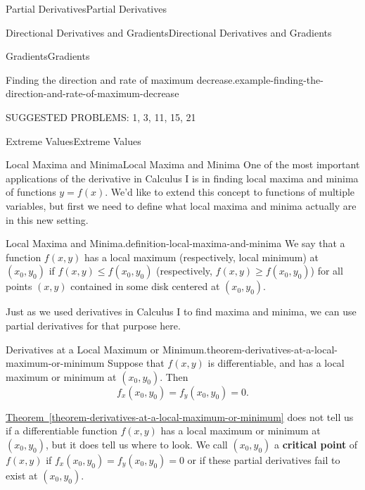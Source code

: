 \documentclass[10pt,]{book}
\newcommand{\terminology}[1]{\textbf{#1}}
\numberwithin{equation}{section}
\begin{document}
\begin{chapterptx}{Partial Derivatives}{}{Partial Derivatives}{}{}
\begin{sectionptx}{Directional Derivatives and Gradients}{}{Directional Derivatives and Gradients}{}{}
\begin{subsectionptx}{Gradients}{}{Gradients}{}{}
\begin{example}{Finding the direction and rate of maximum decrease.}{example-finding-the-direction-and-rate-of-maximum-decrease}
\end{example}
\end{subsectionptx}
\hypertarget{p-1198}{}%
SUGGESTED PROBLEMS: 1, 3, 11, 15, 21%
\end{sectionptx}
%
%
\typeout{************************************************}
\typeout{************************************************}
%
\begin{sectionptx}{Extreme Values}{}{Extreme Values}{}{}\label{section-extreme-values}
%
%
\typeout{************************************************}
\typeout{************************************************}
%
\begin{subsectionptx}{Local Maxima and Minima}{}{Local Maxima and Minima}{}{}\label{subsection-local-maxima-and-minima}
\hypertarget{p-1199}{}%
One of the most important applications of the derivative in Calculus I is in finding local maxima and minima of functions \(y = f(x)\). We'd like to extend this concept to functions of multiple variables, but first we need to define what local maxima and minima actually are in this new setting.%
\begin{definition}{Local Maxima and Minima.}{definition-local-maxima-and-minima}%
\hypertarget{p-1200}{}%
We say that a function \(f(x,y)\) has a local maximum (respectively, local minimum) at \((x_{0},y_{0})\) if \(f(x,y)\leq f(x_{0},y_{0})\) (respectively, \(f(x,y)\geq f(x_{0},y_{0})\)) for all points \((x,y)\) contained in some disk centered at \((x_{0},y_{0})\).%
\end{definition}
\hypertarget{p-1201}{}%
Just as we used derivatives in Calculus I to find maxima and minima, we can use partial derivatives for that purpose here.%
\begin{theorem}{Derivatives at a Local Maximum or Minimum.}{}{theorem-derivatives-at-a-local-maximum-or-minimum}%
\hypertarget{p-1202}{}%
Suppose that \(f(x,y)\) is differentiable, and has a local maximum or minimum at \((x_{0},y_{0})\). Then%
\begin{equation*}
f_{x}(x_{0},y_{0}) = f_{y}(x_{0},y_{0}) = 0.
\end{equation*}
%
\end{theorem}
\hypertarget{p-1203}{}%
\hyperref[theorem-derivatives-at-a-local-maximum-or-minimum]{Theorem~\ref{theorem-derivatives-at-a-local-maximum-or-minimum}} does not tell us if a differentiable function \(f(x,y)\) has a local maximum or minimum at \((x_{0},y_{0})\), but it does tell us where to look. We call \((x_{0},y_{0})\) a \terminology{critical point} of \(f(x,y)\) if \(f_{x}(x_{0},y_{0}) = f_{y}(x_{0},y_{0}) = 0\) or if these partial derivatives fail to exist at \((x_{0},y_{0})\).%

\end{subsectionptx}
\end{sectionptx}
\end{chapterptx}
\end{document}
